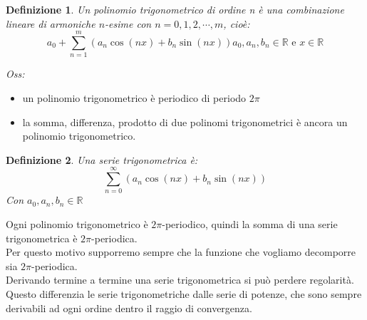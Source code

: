 \documentclass{scrreprt}
\newtheorem{defn}{Definizione}
\newenvironment{definition}{\begin{mdframed}[backgroundcolor=Ivory2]\begin{defn}}{\end{defn}\end{mdframed}}
\begin{document}
\begin{definition}
	Un polinomio trigonometrico di ordine n è una combinazione lineare di  armoniche $n$-esime con $n=0,1,2,\cdots,m$, cioè:
	\begin{equation}
		a_0 + \sum_{n=1}^m \left(a_n \cos(nx) + b_n \sin(nx)\right)
		a_0, a_n, b_n \in \mathbb{R} \text{ e } x\in\mathbb{R}
	\end{equation}
\end{definition}
\emph{Oss:}
\begin{itemize}
	\item un polinomio trigonometrico è periodico di periodo $2\pi$
	\item la somma, differenza, prodotto di due polinomi trigonometrici è ancora un polinomio trigonometrico.
\end{itemize}

\begin{definition}
	Una serie trigonometrica è:
	\begin{equation}
		\sum_{n=0}^\infty \left(a_n \cos(nx) + b_n \sin(nx)\right)
	\end{equation}
	Con $a_0,a_n,b_n\in\mathbb{R}$
\end{definition}

Ogni polinomio trigonometrico è $2\pi$-periodico, quindi la somma di una serie trigonometrica è $2\pi$-periodica.\\
Per questo motivo supporremo sempre che la funzione che vogliamo decomporre sia $2\pi$-periodica.\\


Derivando termine a termine una serie trigonometrica si può perdere regolarità. Questo differenzia le serie trigonometriche dalle serie di potenze, che sono sempre derivabili ad ogni ordine dentro il raggio di convergenza.

\end{document}
